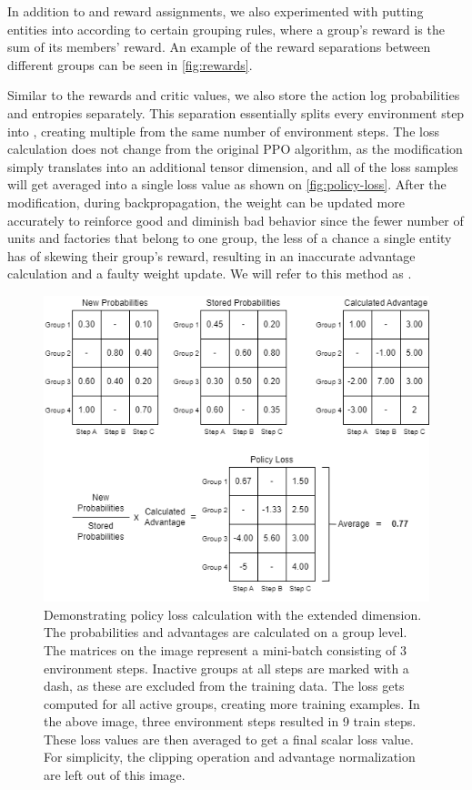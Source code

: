 \bigskip

\noindent In addition to  and  reward assignments, we also experimented with putting entities into  according to certain grouping rules, where a group's reward is the sum of its members' reward. An example of the reward separations between different groups can be seen in \autoref{fig:rewards}.

\bigskip

\noindent Similar to the rewards and critic values, we also store the action log probabilities and entropies separately. This separation essentially splits every environment step into , creating multiple  from the same number of environment steps. The loss calculation does not change from the original PPO algorithm, as the modification simply translates into an additional tensor dimension, and all of the loss samples will get averaged into a single loss value as shown on \autoref{fig:policy-loss}. After the modification, during backpropagation, the weight can be updated more accurately to reinforce good and diminish bad behavior since the fewer number of units and factories that belong to one group, the less of a chance a single entity has of skewing their group's reward, resulting in an inaccurate advantage calculation and a faulty weight update. We will refer to this method as .

\begin{figure}[htbp]
    \centering
    \includegraphics[width=0.7\linewidth]{images/methods_hybrid/trajectory_separation/policy_loss.png}
    \captionsetup{justification=justified, singlelinecheck=false, width=1\linewidth, labelfont=bf} 
    \caption[]{Demonstrating policy loss calculation with the extended dimension. The probabilities and advantages are calculated on a group level. The matrices on the image represent a mini-batch consisting of 3 environment steps. Inactive groups at all steps are marked with a dash, as these are excluded from the training data. The loss gets computed for all active groups, creating more training examples. In the above image, three environment steps resulted in 9 train steps. These loss values are then averaged to get a final scalar loss value. For simplicity, the clipping operation and advantage normalization are left out of this image.}
    \label{fig:policy-loss}
\end{figure}

